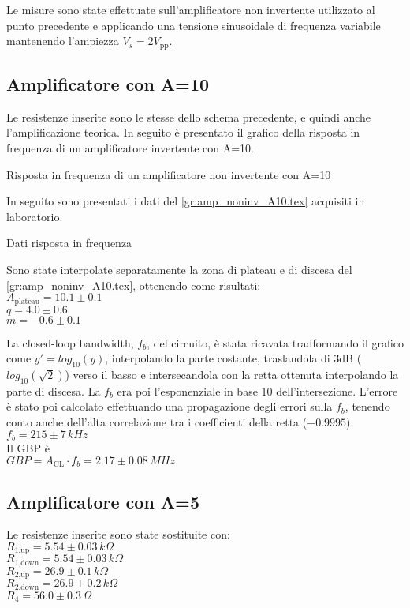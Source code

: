 Le misure sono state effettuate sull'amplificatore non invertente utilizzato al punto precedente e applicando una tensione sinusoidale 
di frequenza variabile mantenendo l'ampiezza $V_s= 2 V_\textrm{pp}$.

\subsection{Amplificatore con A=10}
Le resistenze inserite sono le stesse dello schema precedente, e quindi anche l'amplificazione teorica.
In seguito è presentato il grafico della risposta in frequenza di un amplificatore invertente con A=10.
\begin{grafico}
 \centering 
  \resizebox{\textwidth}{!}{%
 
 }%
 \caption{Risposta in frequenza di un amplificatore non invertente con A=10} 
 \label{gr:amp_noninv_A10.tex} 
\end{grafico}
In seguito sono presentati i dati del  \autoref{gr:amp_noninv_A10.tex} acquisiti in laboratorio.
\begin{tabella}
 \centering
  
 \caption{Dati risposta in frequenza}
 \label{tab:tab_noninv_A10.tex}
\end{tabella}

Sono state interpolate separatamente la zona di plateau e di discesa del \autoref{gr:amp_noninv_A10.tex}, ottenendo come risultati:\\
$A_\textrm{plateau}=10.1 \pm 0.1 $\\
$q = 4.0 \pm 0.6$\\
$m = -0.6 \pm 0.1$

La closed-loop bandwidth, $f_b$, del circuito, è stata ricavata tradformando il grafico come $y'=log_\textrm{10}(y)$, interpolando la parte costante, 
traslandola di 3dB ($log_\textrm{10}(\sqrt{2})$) verso il basso e intersecandola con la retta ottenuta interpolando la parte di discesa. La $f_b$ era poi l'esponenziale in base 10 dell'intersezione.
L'errore è stato poi calcolato effettuando una propagazione degli errori sulla $f_b$, tenendo conto anche dell'alta correlazione tra i coefficienti della retta ($-0.9995$).\\%
$f_b= 215 \pm 7 \,kHz $\\
Il GBP è\\
$GBP=A_\textrm{CL} \cdot f_b = 2.17 \pm 0.08 \,MHz$\\


\subsection{Amplificatore con A=5}
Le resistenze inserite sono state sostituite con:\\
$R_\textrm{1,up}=5.54 \pm 0.03\,k\Omega $\\ %
$R_\textrm{1,down}=5.54 \pm 0.03\,k\Omega$\\ %
$R_\textrm{2,up}=26.9 \pm 0.1\,k\Omega$\\ %
$R_\textrm{2,down}=26.9 \pm 0.2 \,k\Omega$\\
$R_4=56.0 \pm 0.3\,\Omega$

